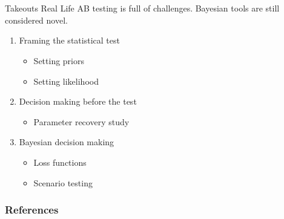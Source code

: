 \documentclass{beamer}
\begin{document}
\section{}
\begin{frame}{Takeouts}
Real Life AB testing is full of challenges. Bayesian tools are still considered novel.
    \begin{enumerate}
        \item Framing the statistical test
        \begin{itemize}
            \item Setting priors
            \item Setting likelihood
        \end{itemize}
        \item Decision making before the test
        \begin{itemize}
            \item Parameter recovery study
        \end{itemize}
        \item Bayesian decision making
        \begin{itemize}
            \item Loss functions
            \item Scenario testing
        \end{itemize}
    \end{enumerate}
\end{frame}
\begin{frame}[allowframebreaks]
\frametitle{References}


\end{frame}
\end{document}
